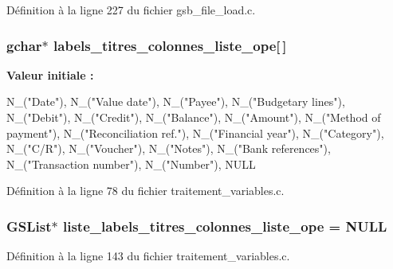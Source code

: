 Définition à la ligne 227 du fichier gsb\_\-file\_\-load.c.

\subsubsection[{labels\_\-titres\_\-colonnes\_\-liste\_\-ope}]{\setlength{\rightskip}{0pt plus 5cm}gchar$\ast$ {\bf labels\_\-titres\_\-colonnes\_\-liste\_\-ope}[$\,$]}\label{traitement__variables_8c_a959df065775b54fe787aed249fb63ef7}
{\bfseries Valeur initiale :}
\begin{DoxyCode}
 {
    N_("Date"),
    N_("Value date"),
    N_("Payee"),
    N_("Budgetary lines"),
    N_("Debit"),
    N_("Credit"),
    N_("Balance"),
    N_("Amount"),
    N_("Method of payment"),
    N_("Reconciliation ref."),
    N_("Financial year"),
    N_("Category"),
    N_("C/R"),
    N_("Voucher"),
    N_("Notes"),
    N_("Bank references"),
    N_("Transaction number"),
    N_("Number"),
    NULL }
\end{DoxyCode}


Définition à la ligne 78 du fichier traitement\_\-variables.c.

\subsubsection[{liste\_\-labels\_\-titres\_\-colonnes\_\-liste\_\-ope}]{\setlength{\rightskip}{0pt plus 5cm}GSList$\ast$ {\bf liste\_\-labels\_\-titres\_\-colonnes\_\-liste\_\-ope} = NULL}\label{traitement__variables_8c_a53693b9d5a4ba330fa5650e09ef0519f}


Définition à la ligne 143 du fichier traitement\_\-variables.c.

